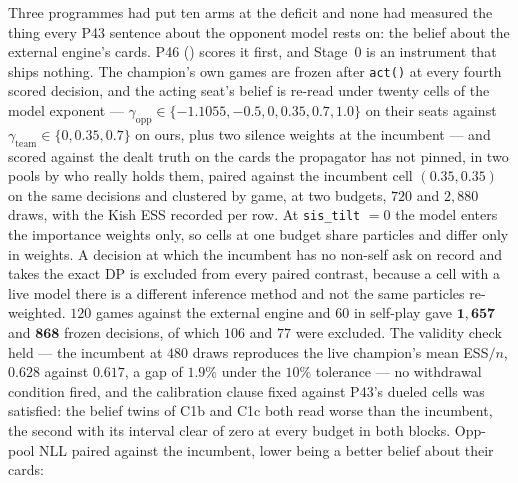 \documentclass[11pt,letterpaper]{article}
\begin{document}
Three programmes had put ten arms at the deficit and none had measured the
thing every P43 sentence about the opponent model rests on: the belief about
the external engine's cards. P46 () scores it
first, and Stage~0 is an instrument that ships nothing. The champion's own
games are frozen after \texttt{act()} at every fourth scored decision, and
the acting seat's belief is re-read under twenty cells of the model exponent
--- $\gamma_{\text{opp}} \in \{-1.1055, -0.5, 0, 0.35, 0.7, 1.0\}$ on their
seats against $\gamma_{\text{team}} \in \{0, 0.35, 0.7\}$ on ours, plus two
silence weights at the incumbent --- and scored against the dealt truth on the
cards the propagator has not pinned, in two pools by who really holds them,
paired against the incumbent cell $(0.35, 0.35)$ on the same decisions and
clustered by game, at two budgets, $720$ and $2{,}880$ draws, with the Kish
ESS recorded per row. At \texttt{sis\_tilt} $=0$ the model enters the
importance weights only, so cells at one budget share particles and differ
only in weights. A decision at which the incumbent has no non-self ask on
record and takes the exact DP is excluded from every paired contrast, because
a cell with a live model there is a different inference method and not the
same particles re-weighted. $120$ games against the external engine and $60$ in self-play
gave $\mathbf{1{,}657}$ and $\mathbf{868}$ frozen decisions, of which $106$
and $77$ were excluded. The validity check held --- the incumbent at $480$
draws reproduces the live champion's mean ESS$/n$, $\mathbf{0.628}$ against
$\mathbf{0.617}$, a gap of $\mathbf{1.9\%}$ under the $10\%$ tolerance --- no
withdrawal condition fired, and the calibration clause fixed against P43's
dueled cells was satisfied: the belief twins of C1b and C1c both read worse
than the incumbent, the second with its interval clear of zero at every budget
in both blocks. Opp-pool NLL paired against the incumbent, lower being a
better belief about their cards:
\end{document}
